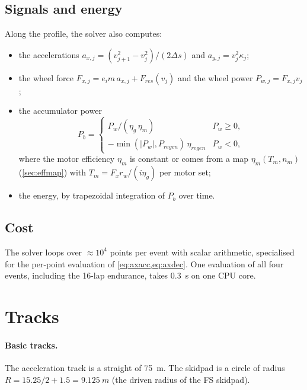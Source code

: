\documentclass[11pt]{article}
\begin{document}
\subsection{Signals and energy}
Along the profile, the solver also computes:
\begin{itemize}
  \item the accelerations $a_{x,j} = (v_{j+1}^2 - v_j^2)/(2\Delta s)$ and $a_{y,j} = v_j^2\kappa_j$;
  \item the wheel force $F_{x,j} = e_i m\,a_{x,j} + F_{res}(v_j)$ and the wheel power $P_{w,j} = F_{x,j}v_j$;
  \item the accumulator power
\begin{equation}
P_{b} = \begin{cases} P_w / (\eta_g\,\eta_m) & P_w\ge 0,\\ -\min(|P_w|, P_{regen})\,\eta_{regen} & P_w<0,\end{cases}
\label{eq:pbatt}
\end{equation}
        where the motor efficiency $\eta_m$ is constant or comes from a map
        $\eta_m(T_m, n_m)$ (\cref{sec:effmap}) with $T_m = F_x r_w/(i\eta_g)$ per motor set;
  \item the energy, by trapezoidal integration of $P_b$ over time.
\end{itemize}

\subsection{Cost}
The solver loops over $\approx\!10^4$ points per event with scalar arithmetic, specialised for the per-point
evaluation of \cref{eq:axacc,eq:axdec}. One evaluation of all four events, including the 16-lap endurance, takes
\SI{0.3}{s} on one CPU core.

\section{Tracks}\label{sec:tracks}
\paragraph{Basic tracks.} The acceleration track is a straight of \SI{75}{m}. The skidpad is a circle of radius
$R = 15.25/2 + 1.5 = \SI{9.125}{m}$ (the driven radius of the FS skidpad).
\end{document}
